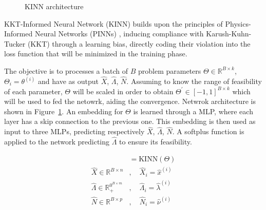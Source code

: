 \documentclass[
]{article}
\begin{document}
\begin{figure}


\caption{\label{fig-architecture}KINN architecture}

\end{figure}%

KKT-Informed Neural Network (KINN) builds upon the principles of
Physics-Informed Neural Networks (PINNs)
\citep{raissiPhysicsinformedNeuralNetworks2019a}, inducing compliance
with Karush-Kuhn-Tucker (KKT) through a learning bias, directly coding
their violation into the loss function that will be minimized in the
training phase.

The objective is to processes a batch of \(B\) problem parameters
\(\Theta \in \mathbb{R}^{B \times k}\), \(\Theta_i = \theta^{(i)}\) and
have as output \(\hat{X}\), \(\hat\Lambda\), \(\hat{N}\). Assuming to
know the range of feasibility of each parameter, \(\Theta\) will be
scaled in order to obtain \(\Theta^\prime \in [-1 , 1]^{B \times k}\)
which will be used to fed the netowrk, aiding the convergence. Netwrok
architecture is shown in Figure~\ref{fig-architecture}. An embedding for
\(\Theta\) is learned through a MLP, where each layer has a skip
connection to the previous one. This embedding is then used as input to
three MLPs, predicting respectively \(\hat{X}\), \(\hat\Lambda\),
\(\hat{N}\). A softplus function is applied to the network predicting
\(\hat\Lambda\) to ensure its feasibility.

\begin{align}
[\hat{X}, \hat{\Lambda}, \hat{N}] &= \textrm{KINN}(\Theta)\\
\hat{X} \in \mathbb{R}^{B\times n}&, \quad \hat X_i = \hat{x}^{(i)}\\
\hat{\Lambda} \in \mathbb{R}^{0^{B\times m}}_+&, \quad \hat\Lambda_i = \hat\lambda^{(i)}\\
\hat{N} \in \mathbb{R}^{B\times p}&, \quad \hat{N}_i = \hat\nu^{(i)}
\end{align}
\end{document}
